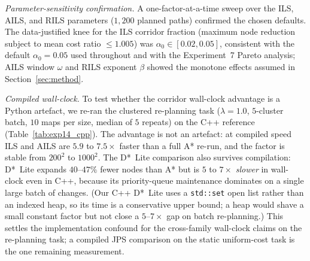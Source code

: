 \documentclass[preprint,12pt,authoryear]{elsarticle}
\begin{document}
\begin{table}[!htbp]
\centering
\caption{Admissibility audit of the risk-adjusted heuristic $h_\lambda$ at $\lambda = 1.0$ (Experiment~14, 50 paired queries per cell). ``Viol.'' is the fraction of queries returning above the $h_0$-optimum; ``Excess'' is the maximum cost ratio $-1$. $\bar{\rho}_0=0$ is unconditionally admissible (Proposition~\ref{prop:admissible}).}
\label{tab:exp14_rho}
\end{table}

\emph{Parameter-sensitivity confirmation.} A one-factor-at-a-time sweep over the ILS, AILS, and RILS parameters ($1{,}200$ planned paths) confirmed the chosen defaults. The data-justified knee for the ILS corridor fraction (maximum node reduction subject to mean cost ratio $\leq 1.005$) was $\alpha_0 \in [0.02, 0.05]$, consistent with the default $\alpha_0 = 0.05$ used throughout and with the Experiment~7 Pareto analysis; AILS window $\omega$ and RILS exponent $\beta$ showed the monotone effects assumed in Section~\ref{sec:method}.

\emph{Compiled wall-clock.} To test whether the corridor wall-clock advantage is a Python artefact, we re-ran the clustered re-planning task ($\lambda = 1.0$, $5$-cluster batch, $10$ maps per size, median of $5$ repeats) on the C++ reference (Table~\ref{tab:exp14_cpp}). The advantage is not an artefact: at compiled speed ILS and AILS are $5.9$ to $7.5\times$ faster than a full A* re-run, and the factor is stable from $200^2$ to $1000^2$. The D*~Lite comparison also survives compilation: D*~Lite expands $40$--$47\%$ fewer nodes than A* but is $5$ to $7\times$ \emph{slower} in wall-clock even in C++, because its priority-queue maintenance dominates on a single large batch of changes. (Our C++ D*~Lite uses a \texttt{std::set} open list rather than an indexed heap, so its time is a conservative upper bound; a heap would shave a small constant factor but not close a $5$--$7\times$ gap on batch re-planning.) This settles the implementation confound for the cross-family wall-clock claims on the re-planning task; a compiled JPS comparison on the static uniform-cost task is the one remaining measurement.
\end{document}
